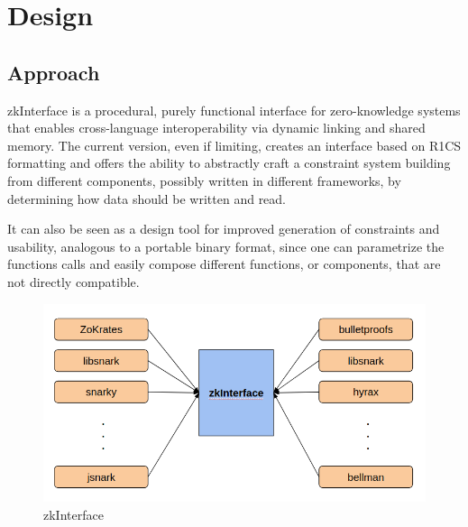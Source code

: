 \section{Design}

\subsection{Approach}


zkInterface is a procedural, purely functional interface for zero-knowledge systems that enables cross-language interoperability via dynamic linking and shared memory. The current version, even if limiting, creates an interface based on R1CS formatting and offers the ability to abstractly craft a constraint system building from different components, possibly written in different frameworks, by determining how data should be written and read. 

It can also be seen as a design tool for improved generation of constraints and usability, analogous to a portable binary format, since one can parametrize the functions calls and easily compose different functions, or components, that are not directly compatible.

\begin{figure}[h!]
	\includegraphics[width=\linewidth]{interface.png}
	\caption{zkInterface}
	\label{interface}
\end{figure}



